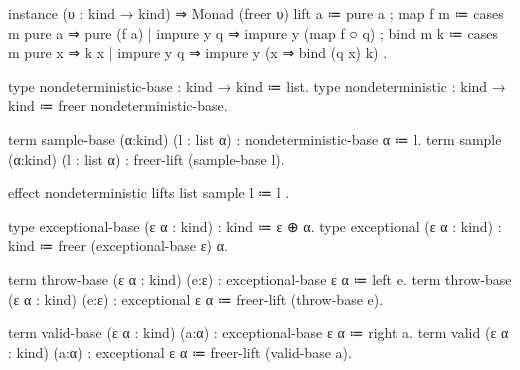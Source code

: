 \documentclass[12pt]{reedthesis}
\begin{document}

\begin{snippet}
instance (υ : kind → kind) ⇒ Monad (freer υ)
  { lift a   ≔ pure a
  ; map  f m ≔ cases m
                { pure   a   ⇒ pure (f a)
                | impure y q ⇒ impure y (map f ○ q) }
  ; bind m k ≔ cases m
                { pure   x   ⇒ k x
                | impure y q ⇒ impure y (x ⇒ bind (q x) k) } }.
\end{snippet}

\begin{snippet}
type nondeterministic-base : kind → kind ≔ list.
type nondeterministic      : kind → kind ≔ freer nondeterministic-base.

term sample-base (α:kind) (l : list α) : nondeterministic-base α ≔ l.
term sample      (α:kind) (l : list α) : freer-lift (sample-base l).

effect nondeterministic
 lifts list
  { sample l ≔ l }.
\end{snippet}

\begin{snippet}
type exceptional-base (ε α : kind) : kind ≔ ε ⊕ α.
type exceptional      (ε α : kind) : kind ≔ freer (exceptional-base ε) α.

term throw-base (ε α : kind) (e:ε) : exceptional-base ε α ≔ left e.
term throw-base (ε α : kind) (e:ε) : exceptional      ε α ≔ freer-lift (throw-base e).

term valid-base (ε α : kind) (a:α) : exceptional-base ε α ≔ right a.
term valid      (ε α : kind) (a:α) : exceptional      ε α ≔ freer-lift (valid-base a).
\end{snippet}
\end{document}
